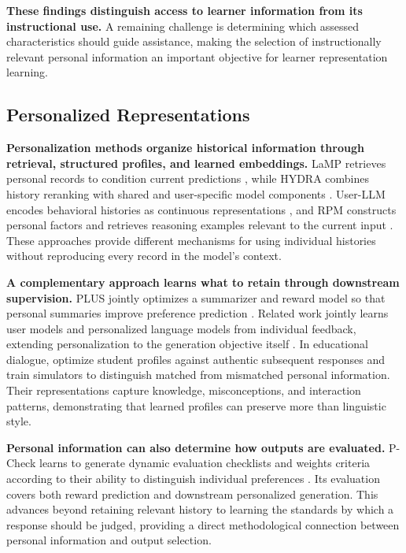\textbf{These findings distinguish access to learner information from its instructional use.} A remaining challenge is determining which assessed characteristics should guide assistance, making the selection of instructionally relevant personal information an important objective for learner representation learning.

\subsection{Personalized Representations}

\textbf{Personalization methods organize historical information through retrieval, structured profiles, and learned embeddings.} LaMP retrieves personal records to condition current predictions \citep{salemi2024lamp}, while HYDRA combines history reranking with shared and user-specific model components \citep{zhuang2024hydra}. User-LLM encodes behavioral histories as continuous representations \citep{ning2025userllm}, and RPM constructs personal factors and retrieves reasoning examples relevant to the current input \citep{kim2026rpm}. These approaches provide different mechanisms for using individual histories without reproducing every record in the model's context.

\textbf{A complementary approach learns what to retain through downstream supervision.} PLUS jointly optimizes a summarizer and reward model so that personal summaries improve preference prediction \citep{nam2026summaries}. Related work jointly learns user models and personalized language models from individual feedback, extending personalization to the generation objective itself \citep{li2024personalized}. In educational dialogue, \citet{duan2026history} optimize student profiles against authentic subsequent responses and train simulators to distinguish matched from mismatched personal information. Their representations capture knowledge, misconceptions, and interaction patterns, demonstrating that learned profiles can preserve more than linguistic style.

\textbf{Personal information can also determine how outputs are evaluated.} P-Check learns to generate dynamic evaluation checklists and weights criteria according to their ability to distinguish individual preferences \citep{seo2026pcheck}. Its evaluation covers both reward prediction and downstream personalized generation. This advances beyond retaining relevant history to learning the standards by which a response should be judged, providing a direct methodological connection between personal information and output selection.

